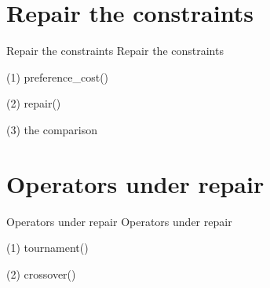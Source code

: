 
\section{Repair the constraints}

\begin{frame}{Repair the constraints}
Repair the constraints
\end{frame}

\begin{frame}[fragile]{(1) preference\_cost()}

\end{frame}

\begin{frame}[fragile]{(2) repair()}

\end{frame}

\begin{frame}[fragile]{(3) the comparison}

\end{frame}


\section{Operators under repair}

\begin{frame}{Operators under repair}
Operators under repair
\end{frame}

\begin{frame}[fragile]{(1) tournament()}

\end{frame}

\begin{frame}[fragile]{(2) crossover()}

\end{frame}

